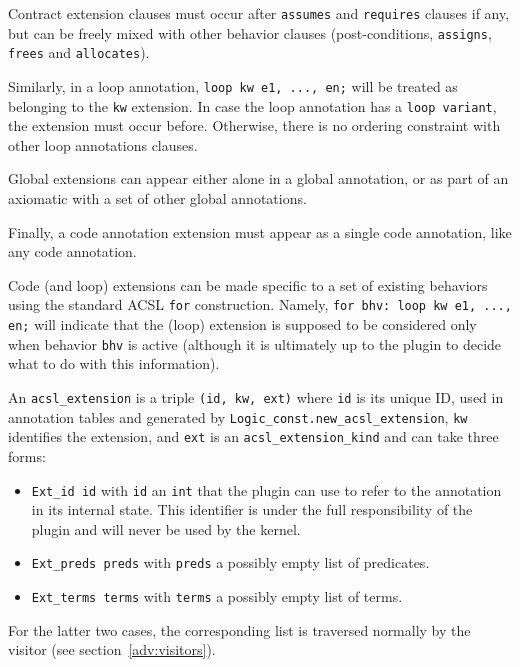 Contract extension clauses must occur after \verb|assumes| and \verb|requires| clauses if any, but
can be freely mixed with other behavior clauses (post-conditions, \verb|assigns|, \verb|frees| and
\verb|allocates|).

Similarly, in a loop annotation, \verb|loop kw e1, ..., en;| will be treated as belonging to the
\verb|kw| extension. In case the loop annotation has a \verb|loop variant|, the extension must 
occur before. Otherwise, there is no ordering constraint with other loop annotations clauses.

Global extensions can appear either alone in a global annotation, or as part of an axiomatic with
a set of other global annotations.

Finally, a code annotation extension must appear as a single code annotation, like any code annotation.

Code (and loop) extensions can be made specific to a
set of existing behaviors using the standard ACSL \verb|for| construction.
Namely, \verb|for bhv: loop kw e1, ..., en;| will indicate that the
(loop) extension is supposed to be considered only when behavior \verb|bhv| is
active (although it is ultimately up to the plugin to decide what to do with
this information).

An \texttt{acsl\_extension} is a triple
\texttt{(id, kw, ext)} where \texttt{id} is its unique ID, used in annotation tables and generated
by \texttt{Logic\_const.new\_acsl\_extension},
\texttt{kw} identifies the extension, and \texttt{ext} is an
\texttt{acsl\_extension\_kind}
and can take three forms:
\begin{itemize}
\item \texttt{Ext\_id id} with \texttt{id} an \texttt{int}
that the plugin can use to refer to the annotation in its internal state.
This identifier is under the full responsibility of the plugin
 and will never be used by the kernel.
\item \texttt{Ext\_preds preds} with \texttt{preds} a possibly empty list of
predicates.
\item \texttt{Ext\_terms terms} with \texttt{terms} a possibly empty list of
  terms.
\end{itemize}
For the latter two cases,
the corresponding list is traversed normally by the visitor
(see section~\ref{adv:visitors}).

